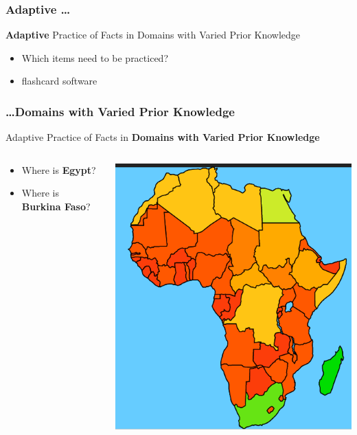 \documentclass[xcolor=svgnames]{beamer}
\begin{document}
\begin{frame}
	\frametitle{Adaptive \ldots}
   \textbf{Adaptive} Practice of Facts in Domains with Varied Prior Knowledge
	\begin{itemize}
	  \item Which items need to be practiced?
    \item flashcard software
    \
	\end{itemize}
\end{frame}
\begin{frame}
	\frametitle{\ldots Domains with Varied Prior Knowledge}
       Adaptive Practice of Facts in \textbf{Domains with Varied Prior Knowledge}
  \begin{columns}
   \begin{column}{.49\textwidth}
      \begin{itemize}
        \item Where is \textbf{Egypt}?
        \item Where is \textbf{Burkina Faso}?
        \\
        \
      \end{itemize}
    \end{column}
    \begin{column}{.49\textwidth}
       \includegraphics[width=\textwidth]{img/knowledge-map.png}
    \end{column}
  \end{columns}
\end{frame}
\end{document}
